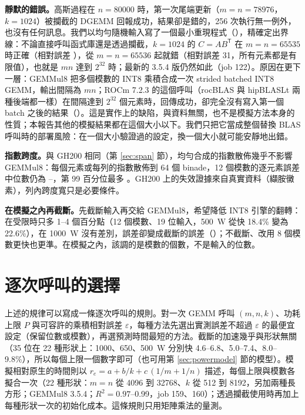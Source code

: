 \textbf{靜默的錯誤。}高斯過程在 $n=80000$ 時，第一次尾端更新（$m=n=78976$，$k=1024$）被攔截的 DGEMM 回報成功，結果卻是錯的，256 次執行無一例外，也沒有任何訊息。我們以均勻隨機輸入寫了一個最小重現程式（），精確定出界線：不論直接呼叫函式庫還是透過攔截，$k=1024$ 的 $C=AB^{\mathsf T}$ 在 $m=n=65535$ 時正確（相對誤差 ），從 $m=n=65536$ 起就錯（相對誤差 31，所有元素都是有限值），也就是 $mn$ 達到 $2^{32}$ 時；最新的 3.5.4 版仍然如此（job 122）。原因在更下一層：GEMMul8 把多個模數的 INT8 乘積合成一次 strided batched INT8 GEMM，輸出間隔為 $mn$；ROCm 7.2.3 的這個呼叫（rocBLAS 與 hipBLASLt 兩種後端都一樣）在間隔達到 $2^{32}$ 個元素時，回傳成功，卻完全沒有寫入第一個 batch 之後的結果（）。這是實作上的缺陷，與資料無關，也不是模擬方法本身的性質；本報告其他的模擬結果都在這個大小以下。我們只把它當成整個替換 BLAS 呼叫時的部署風險：在一個大小驗證過的設定，換一個大小就可能安靜地出錯。

\textbf{指數跨度。}與 GH200 相同（第 \ref{sec:span} 節），均勻合成的指數散佈幾乎不影響 GEMMul8：每個元素或每列的指數散佈到 64 個 binade，12 個模數的逐元素誤差中位數仍為 –，第 99 百分位最多 。GH200 上的失效證據來自真實資料（纈胺黴素），列內跨度寬只是必要條件。

\textbf{在模擬之內再截斷。}先截斷輸入再交給 GEMMul8，希望降低 INT8 引擎的翻轉：在受限時只多 1–4 個百分點（12 個模數、19 位輸入，500~W 從快 18.4\% 變為 22.6\%），在 1000~W 沒有差別，誤差卻變成截斷的誤差（）；不截斷、改用 8 個模數更快也更準。在模擬之內，該調的是模數的個數，不是輸入的位數。

\section{逐次呼叫的選擇}\label{sec:mi-selector}

上述的規律可以寫成一條逐次呼叫的規則。對一次 GEMM 呼叫 $(m,n,k)$、功耗上限 $P$ 與可容許的乘積相對誤差 $\varepsilon$，每種方法先選出實測誤差不超過 $\varepsilon$ 的最便宜設定（保留位數或模數），再選預測時間最短的方法。截斷的加速幾乎與形狀無關（35 位在 22 種形狀上：1000、650、500~W 分別快 4.6–6.8、5.0–7.4、8.0–9.8\%），所以每個上限一個數字即可（也可用第 \ref{sec:powermodel} 節的模型）。模擬相對原生的時間則以 $r_e = a + b/k + c\,(1/m+1/n)$ 描述，每個上限與模數各擬合一次（22 種形狀：$m=n$ 從 4096 到 32768、$k$ 從 512 到 8192，另加兩種長方形；GEMMul8 3.5.4；$R^2=0.97$–0.99，job 159、160）；透過攔截使用時再加上每種形狀一次的初始化成本。這條規則只用矩陣乘法的量測。

